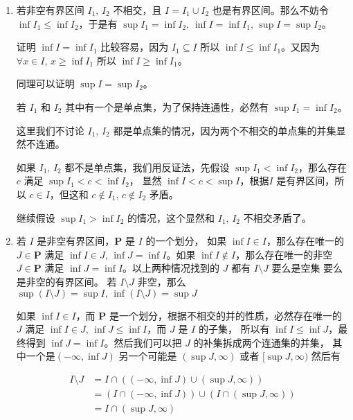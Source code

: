 \begin{enumerate}
    \item 若非空有界区间 $I_1,\, I_2$ 不相交，且 $I = I_1 \cup I_2$ 也是有界区间。那么不妨令 $\inf I_1 \le \inf I_2$，于是有 $\sup I_1 = \inf I_2,\, \inf I = \inf I_1,\, \sup I = \sup I_2$。

    证明 $\inf I = \inf I_1$ 比较容易，因为 $I_1 \subseteq I $ 所以 $\inf I \le \inf I_1$。又因为 $\forall x \in I,\, x \ge \inf I_1$ 所以 $\inf I \ge \inf I_1$。

    同理可以证明 $\sup I = \sup I_2$。

    若 $I_1$ 和 $I_2$ 其中有一个是单点集，为了保持连通性，必然有 $\sup I_1 = \inf I_2$。
    
    这里我们不讨论 $I_1,\, I_2$ 都是单点集的情况，因为两个不相交的单点集的并集显然不连通。

    如果 $I_1,\, I_2$ 都不是单点集，我们用反证法，先假设 $\sup I_1 < \inf I_2$，那么存在 $c$ 满足 $\sup I_1 < c < \inf I_2$，
    显然 $\inf I < c < \sup I$，根据$I$ 是有界区间，所以 $c \in I$，但这和 $c \notin I_1,\, c \notin I_2$ 矛盾。

    继续假设 $\sup I_1 > \inf I_2$ 的情况，这个显然和 $I_1,\, I_2$ 不相交矛盾了。

    \item 若 $I$ 是非空有界区间，$\mathbf{P}$ 是 $I$ 的一个划分，
    如果 $\inf I \in I$，那么存在唯一的 $J \in \mathbf{P}$ 满足 $\inf I \in J,\, \inf J = \inf I$。如果 $\inf I \notin I$，那么存在唯一的非空 $J \in \mathbf{P}$
    满足 $\inf J = \inf I$。以上两种情况找到的 $J$ 都有 $I \setminus J$ 要么是空集 要么是非空的有界区间。
    若 $I \setminus J$ 非空，那么 $\sup (I \setminus J) = \sup I,\, \inf (I \setminus J) = \sup J$

    如果 $\inf I \in I$，而 $\mathbf{P}$ 是一个划分，根据不相交的并的性质，必然存在唯一的 $J$ 满足 $\inf I \in J,\, \inf J \le \inf I$，而 $J$ 是 $I$ 的子集，
    所以有 $\inf I \le \inf J$，最终得到 $\inf J = \inf I$。然后我们可以把 $J$ 的补集拆成两个连通集的并集，
    其中一个是$(-\infty, \inf J)$ 另一个可能是 $(\sup J, \infty)$ 或者 $[\sup J, \infty)$
    然后有

    \begin{align*}
    I \setminus J &= I \cap ((-\infty, \inf J) \cup (\sup J, \infty)) \\
    & = (I \cap (-\infty, \inf J)) \cup (I \cap (\sup J, \infty)) \\ 
    & = I \cap (\sup J, \infty) \\
    \end{align*}


\end{enumerate}
